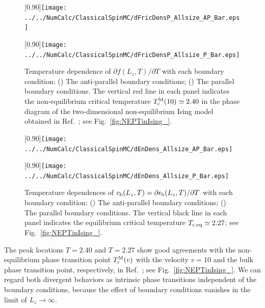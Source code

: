 \begin{figure}[htbp]
	\centering
	\subcaptionbox{\label{fig:dFricDens_Allsize_AP}}[0.90\linewidth]{\texttt{[image: ../../NumCalc/ClassicalSpinMC/dFricDensP\_Allsize\_AP\_Bar.eps]}}
	
	\subcaptionbox{\label{fig:dFricDens_Allsize_P}}[0.90\linewidth]{\texttt{[image: ../../NumCalc/ClassicalSpinMC/dFricDensP\_Allsize\_P\_Bar.eps]}}
	
	\caption{Temperature dependence of $\partial f(L_{z}, T)/\partial T$ with each boundary condition: () The anti-parallel boundary conditions; () The parallel boundary conditions. The vertical red line in each panel indicates the non-equilibrium critical temperature $T^{\rm M}_{\rm c}(10)\simeq 2.40$ in the phase diagram of the two-dimensional non-equilibrium Ising model obtained in Ref.~\cite{Hucht2009b}; see Fig.~\ref{fig:NEPTinIsing_}.}
	\label{fig:dFricDens_Allsize}
\end{figure}

\begin{figure}[htbp]
	\centering
	\subcaptionbox{\label{fig:dEnDens_Allsize_AP}}[0.90\linewidth]{\texttt{[image: ../../NumCalc/ClassicalSpinMC/dEnDens\_Allsize\_AP\_Bar.eps]}}
	
	\subcaptionbox{\label{fig:dEnDens_Allsize_P}}[0.90\linewidth]{\texttt{[image: ../../NumCalc/ClassicalSpinMC/dEnDens\_Allsize\_P\_Bar.eps]}}
	
	\caption{Temperature dependences of $c_{\rm b}(L_{z}, T) = \partial \epsilon_{\rm b}(L_{z}, T)/\partial T$ with each boundary condition: () The anti-parallel boundary conditions;  () The parallel boundary conditions. The vertical black line in each panel indicates the equilibrium critical temperature $T_{\rm c,eq}\simeq 2.27$; see Fig.~\ref{fig:NEPTinIsing_}.}
	\label{fig:dEnDens_Allsize}
\end{figure}

The peak locations $T=2.40$ and $T=2.27$ show good agreements with the non-equilibrium phase transition point $T_{\rm c}^{\rm M}(v)$ with the velocity $v=10$ and the bulk phase transition point, respectively, in Ref.~\cite{Hucht2009b}; see Fig.~\ref{fig:NEPTinIsing_}. We can regard both divergent behaviors as intrinsic phase transitions independent of the boundary conditions, because the effect of boundary conditions vanishes in the limit of $L_{z}\to\infty$.

